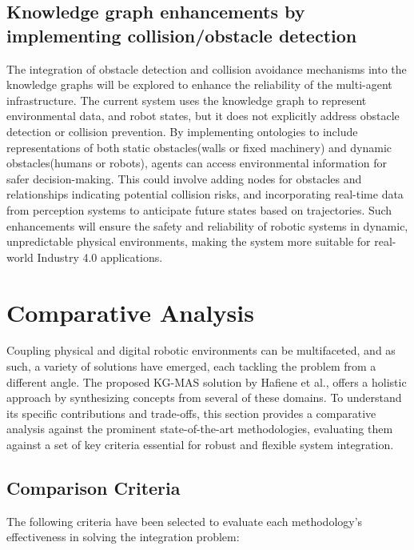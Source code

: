 \documentclass{article} %
\begin{document}
\subsection{Knowledge graph enhancements by implementing collision/obstacle detection}
The integration of obstacle detection and collision avoidance mechanisms into the knowledge graphs will be explored to enhance the reliability of the multi-agent infrastructure. The current system uses the knowledge graph to represent environmental data, and robot states, but it does not explicitly address obstacle detection or collision prevention. By implementing ontologies to include representations of both static obstacles(walls or fixed machinery) and dynamic obstacles(humans or robots), agents can access environmental information for safer decision-making. This could involve adding nodes for obstacles and relationships indicating potential collision risks, and incorporating real-time data from perception systems to anticipate future states based on trajectories. Such enhancements will ensure the safety and reliability of robotic systems in dynamic, unpredictable physical environments, making the system more suitable for real-world Industry 4.0 applications.

\section{Comparative Analysis}
 Coupling physical and digital robotic environments can be multifaceted, and as such, a variety of solutions have emerged, each tackling the problem from a different angle. The proposed KG-MAS solution by Hafiene et al.\cite{hafiene2025knowledge}, offers a  holistic approach by synthesizing concepts from several of these domains. To understand its specific contributions and trade-offs, this section provides a comparative analysis against the prominent state-of-the-art methodologies, evaluating them against a set of key criteria essential for robust and flexible system integration.

 \subsection{Comparison Criteria}
 The following criteria have been selected to evaluate each methodology's effectiveness in solving the integration problem:
 
\end{document}
